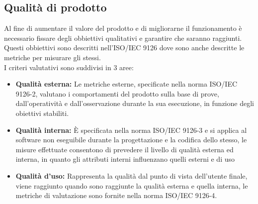 \documentclass[a4paper]{report}
\begin{document}
			\subsection{Qualità di prodotto}
				Al fine di aumentare il valore del prodotto e di migliorarne il funzionamento è necessario fissare degli obbiettivi
				qualitativi e garantire che saranno raggiunti.\\
				Questi obbiettivi sono descritti nell'ISO/IEC 9126 dove sono anche descritte le metriche per misurare gli stessi.\\
				I criteri valutativi sono suddivisi in 3 aree:
				\begin{itemize}
					\item \textbf{Qualità esterna:} Le metriche esterne, specificate nella norma ISO/IEC 9126-2, valutano i
					comportamenti del prodotto sulla base di prove, dall'operatività e dall'osservazione durante la sua esecuzione, 					in funzione degli obiettivi stabiliti.
					\item \textbf{Qualità interna:} È specificata nella norma ISO/IEC 9126-3 e si applica al software non
					eseguibile durante la progettazione e la codifica dello stesso, le misure effettuate consentono di prevedere il
					livello di qualità esterna ed interna, in quanto gli attributi interni influenzano quelli esterni e di uso
					\item \textbf{Qualità d'uso:}  Rappresenta la qualità dal punto di vista dell'utente finale, viene raggiunto
					quando sono raggiunte la qualità esterna e quella interna, le metriche di valutazione sono fornite nella norma
					ISO/IEC 9126-4.
				\end{itemize}
				
\end{document}
